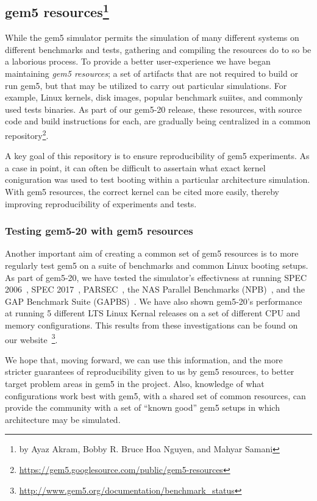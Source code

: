\subsection[gem5 resources]{gem5 resources\footnote{by Ayaz Akram, Bobby R. Bruce Hoa Nguyen, and Mahyar Samani}}

While the gem5 simulator permits the simulation of many different systems on
different benchmarks and tests, gathering and compiling the resources do to so
be a laborious process. To provide
a better user-experience we have began maintaining \emph{gem5
resources}; a set of artifacts
that are not required to build or run gem5, but that may be utilized to carry out
particular simulations. For example, Linux kernels, disk images, popular
benchmark suiites, and commonly used tests binaries. As part of our gem5-20
release, these resources, with source code and build instructions for each, are
gradually being centralized in a common repository\footnote{
\url{https://gem5.googlesource.com/public/gem5-resources}}.

A key goal of this repository is to ensure reproducibility of gem5
experiments. As a case in point, it can often be difficult to assertain what exact
kernel coniguration was used to test booting within a particular architecture
simulation. With gem5 resources, the correct kernel can be cited more easily,
thereby improving reproducibility of experiments and tests.

\subsubsection{Testing gem5-20 with gem5 resources}

Another important aim of creating a common set of gem5 resources is to more
regularly test gem5 on a suite of benchmarks and common Linux booting setups.
As part of gem5-20, we have tested the simulator's effectivness
at running SPEC 2006~\cite{spec06}, SPEC 2017~\cite{spec17},
PARSEC~\cite{parsec}, the NAS Parallel Benchmarks (NPB)~\cite{npb},
and the GAP Benchmark Suite (GAPBS)~\cite{gapbs}. We have also shown gem5-20's
performance at running 5 different LTS Linux Kernal releases on a set of
different CPU and memory configurations. This results from these investigations
can be found on our website~\footnote{
\url{http://www.gem5.org/documentation/benchmark_status}}.

We hope that, moving forward, we can use this information, and the more stricter
guarantees of reproducibility given to us by gem5 resources, to better target
problem areas in gem5 in the project. Also, knowledge of what configurations
work best with gem5, with a shared set of common resources, can provide
the community with a set of ``known good'' gem5 setups in which architecture
may be simulated.

